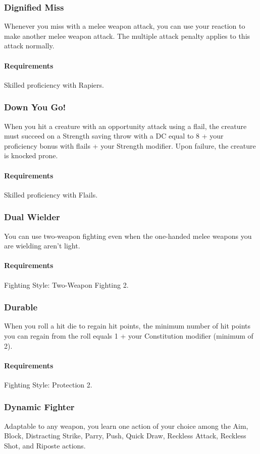 \subsubsection{Dignified Miss} \label{feat::dignifiedmiss}
    Whenever you miss with a melee weapon attack, you can use your reaction to make another melee weapon attack.
    The multiple attack penalty applies to this attack normally.
    \paragraph{Requirements} Skilled proficiency with Rapiers.
\subsubsection{Down You Go!} \label{feat::downyougo}
    When you hit a creature with an opportunity attack using a flail, the creature must succeed on a Strength saving throw with a DC equal to 8 + your proficiency bonus with flails + your Strength modifier.
    Upon failure, the creature is knocked prone.
    \paragraph{Requirements} Skilled proficiency with Flails.
\subsubsection{Dual Wielder} \label{feat::dualwielder}
    You can use two-weapon fighting even when the one-handed melee weapons you are wielding aren't light.
    \paragraph{Requirements} Fighting Style: Two-Weapon Fighting 2.
\subsubsection{Durable} \label{feat::durable}
    When you roll a hit die to regain hit points, the minimum number of hit points you can regain from the roll equals 1 + your Constitution modifier (minimum of 2).
    \paragraph{Requirements} Fighting Style: Protection 2.
\subsubsection{Dynamic Fighter} \label{feat::dynamicfighter}
    Adaptable to any weapon, you learn one action of your choice among the Aim, Block, Distracting Strike, Parry, Push, Quick Draw, Reckless Attack, Reckless Shot, and Riposte actions.
